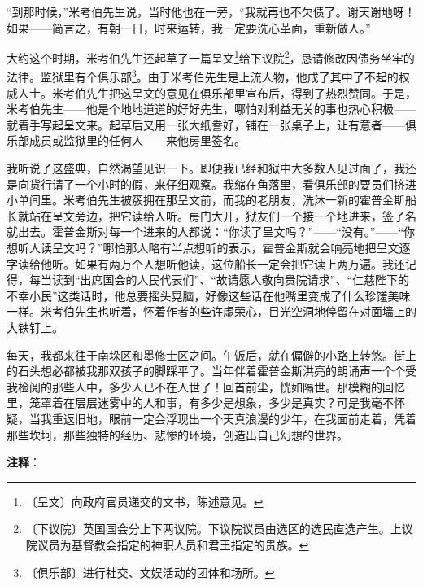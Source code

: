 \documentclass[12pt,UTF-8,openany]{ctexbook}
\begin{document}
\begin{large}
    “到那时候，”米考伯先生说，当时他也在一旁，“我就再也不欠债了。谢天谢地呀！如果——简言之，有朝一日，时来运转，我一定要洗心革面，重新做人。”
    
    大约这个时期，米考伯先生还起草了一篇呈文\footnote{〔呈文〕向政府官员递交的文书，陈述意见。}给下议院\footnote{〔下议院〕英国国会分上下两议院。下议院议员由选区的选民直选产生。上议院议员为基督教会指定的神职人员和君王指定的贵族。}，恳请修改因债务坐牢的法律。监狱里有个俱乐部\footnote{〔俱乐部〕进行社交、文娱活动的团体和场所。}。由于米考伯先生是上流人物，他成了其中了不起的权威人士。米考伯先生把这呈文的意见在俱乐部里宣布后，得到了热烈赞同。于是，米考伯先生——他是个地地道道的好好先生，哪怕对利益无关的事也热心积极——就着手写起呈文来。起草后又用一张大纸誊好，铺在一张桌子上，让有意者——俱乐部成员或监狱里的任何人——来他房里签名。
    
    我听说了这盛典，自然渴望见识一下。即便我已经和狱中大多数人见过面了，我还是向货行请了一个小时的假，来仔细观察。我缩在角落里，看俱乐部的要员们挤进小单间里。米考伯先生被簇拥在那呈文前，而我的老朋友，洗沐一新的霍普金斯船长就站在呈文旁边，把它读给人听。房门大开，狱友们一个接一个地进来，签了名就出去。霍普金斯对每一个进来的人都说：“你读了呈文吗？”——“没有。”——“你想听人读呈文吗？”哪怕那人略有半点想听的表示，霍普金斯就会响亮地把呈文逐字读给他听。如果有两万个人想听他读，这位船长一定会把它读上两万遍。我还记得，每当读到“出席国会的人民代表们”、“故请愿人敬向贵院请求”、“仁慈陛下的不幸小民”这类话时，他总要摇头晃脑，好像这些话在他嘴里变成了什么珍馐美味一样。米考伯先生也听着，怀着作者的些许虚荣心，目光空洞地停留在对面墙上的大铁钉上。
    
    每天，我都来往于南垛区和墨修士区之间。午饭后，就在偏僻的小路上转悠。街上的石头想必都被我那双孩子的脚踩平了。当年伴着霍普金斯洪亮的朗诵声一个个受我检阅的那些人中，多少人已不在人世了！回首前尘，恍如隔世。那模糊的回忆里，笼罩着在层层迷雾中的人和事，有多少是想象，多少是真实？可是我毫不怀疑，当我重返旧地，眼前一定会浮现出一个天真浪漫的少年，在我面前走着，凭着那些坎坷，那些独特的经历、悲惨的环境，创造出自己幻想的世界。
    
\end{large}


\newpage

\textbf{注释}：

\vspace{-1em}
\end{document}
